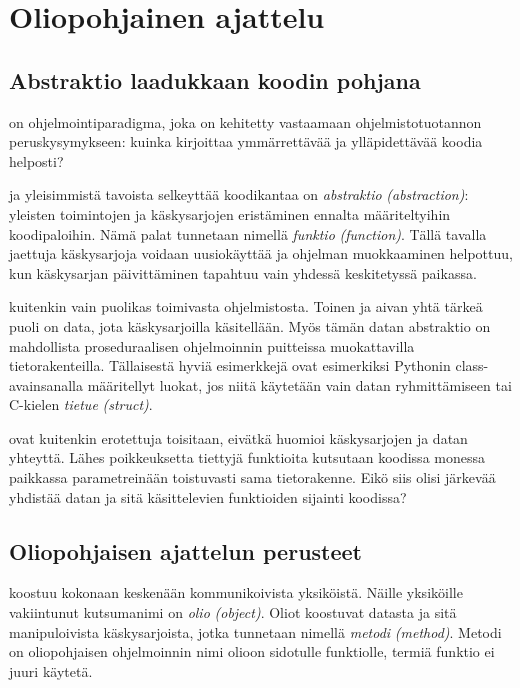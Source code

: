 \documentclass{tufte-book}
\newcommand{\eng}[1]{\textit{(#1)}}
\newcommand{\new}[1]{\textit{\gls{#1}}}
\newcommand{\neweng}[2]{\new{#1} \eng{#2}}
\begin{document}
\chapter{Oliopohjainen ajattelu}
\label{olioista}

\section{Abstraktio laadukkaan koodin pohjana}
\label{abstraktiosta}

 on ohjelmointiparadigma, joka on kehitetty vastaamaan
ohjelmistotuotannon peruskysymykseen: kuinka kirjoittaa ymmärrettävää ja ylläpidettävää koodia
helposti?

 ja yleisimmistä tavoista selkeyttää koodikantaa on
\neweng{abstraktio}{abstraction}: yleisten toimintojen ja käskysarjojen eristäminen ennalta
määriteltyihin koodipaloihin. Nämä palat tunnetaan nimellä \neweng{funktio}{function}. Tällä
tavalla jaettuja käskysarjoja voidaan uusiokäyttää ja ohjelman muokkaaminen helpottuu, kun
käskysarjan päivittäminen tapahtuu vain yhdessä keskitetyssä paikassa.

 kuitenkin vain puolikas toimivasta ohjelmistosta. Toinen ja aivan
yhtä tärkeä puoli on data, jota käskysarjoilla käsitellään. Myös tämän datan abstraktio on
mahdollista proseduraalisen ohjelmoinnin puitteissa muokattavilla tietorakenteilla. Tällaisestä
hyviä esimerkkejä ovat esimerkiksi Pythonin class-avainsanalla määritellyt luokat, jos niitä
käytetään vain datan ryhmittämiseen tai C-kielen \neweng{tietue}{struct}.

 ovat kuitenkin erotettuja toisitaan, eivätkä huomioi
käskysarjojen ja datan yhteyttä. Lähes poikkeuksetta tiettyjä funktioita kutsutaan koodissa
monessa paikkassa parametreinään toistuvasti sama tietorakenne. Eikö siis olisi järkevää yhdistää
datan ja sitä käsittelevien funktioiden sijainti koodissa?


\section{Oliopohjaisen ajattelun perusteet}
\label{oliopohjaisesta ajattelusta}

 koostuu kokonaan keskenään kommunikoivista yksiköistä.
Näille yksiköille vakiintunut kutsumanimi on \neweng{olio}{object}. Oliot koostuvat datasta ja
sitä manipuloivista käskysarjoista, jotka tunnetaan nimellä \neweng{metodi}{method}. Metodi on
oliopohjaisen ohjelmoinnin nimi olioon sidotulle funktiolle, termiä \gls{funktio} ei juuri
käytetä.
\end{document}
